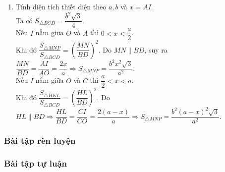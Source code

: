 \begin{vd}
{\begin{enumerate}
{			}	
			\noindent
			Nếu $I \in OC$ thì thiết diện là tam giác đều $HKL$ có các cạnh tương ứng song song với cạnh tam giác $SBD$.
			\item Tính diện tích thiết diện theo $a,b$ và $x=AI$.\\
			Ta có $S_{\triangle BCD}=\dfrac{b^2\sqrt{3}}{4}$.\\
			Nếu $I$ nằm giữa $O$ và $A$ thì $0<x<\dfrac{a}{2}$.\\
			Khi đó $\dfrac{S_{\triangle MNP}}{S_{\triangle BCD}}=\left(\dfrac{MN}{BD}\right)^2$. Do $MN \parallel BD$, suy ra $\dfrac{MN}{BD}=\dfrac{AI}{AO}=\dfrac{2x}{a} \Rightarrow S_{\triangle MNP}=\dfrac{b^2x^2\sqrt{3}}{a^2}$.\\
			Nếu $I$ nằm giữa $O$ và $C$  thì $\dfrac{a}{2}<x<a$.\\
			Khi đó $\dfrac{S_{\triangle HKL}}{S_{\triangle BCD}}=\left(\dfrac{HL}{BD}\right)^2$. Do $HL \parallel BD\Rightarrow \dfrac{HL}{BD}=\dfrac{CI}{CO}=\dfrac{2(a-x)}{a} \Rightarrow S_{\triangle MNP}=\dfrac{b^2(a-x)^2\sqrt{3}}{a^2}$.			
		\end{enumerate}
		
	}
\end{vd}

\subsubsection{Bài tập rèn luyện}
\subsubsection{Bài tập tự luận}

